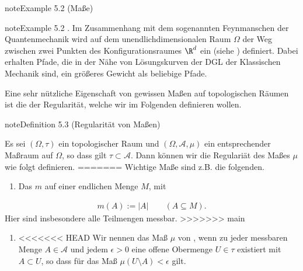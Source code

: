 \documentclass[letterpaper,10pt,english]{jupyterBook}
\begin{document}
\begin{sphinxadmonition}{note}{Example 5.2 (Maße)}
\begin{sphinxadmonition}{note}{Example 5.2}
. Im Zusammenhang mit dem sogenannten Feynmanschen  der Quantenmechanik wird auf dem unendlich\sphinxhyphen{}dimensionalen Raum \(\Omega\) der Weg zwischen zwei Punkten des Konfigurationsraumes \(\R^d\) ein  (siehe {\hyperref[\detokenize{masstheorie/masstheorie:rem:wahrscheinlichkeitsmass}]{}}) definiert.
Dabei erhalten Pfade, die in der Nähe von Lösungskurven der DGL der Klassischen Mechanik sind, ein größeres Gewicht als beliebige Pfade.
\end{sphinxadmonition}

\sphinxAtStartPar
Eine sehr nützliche Eigenschaft von gewissen Maßen auf topologischen Räumen ist die der Regularität, welche wir im Folgenden definieren wollen.
\label{masstheorie/masstheorie:def:regularitaet}
\begin{sphinxadmonition}{note}{Definition 5.3 (Regularität von Maßen)}



\sphinxAtStartPar
Es sei \((\Omega, \tau)\) ein topologischer Raum und \((\Omega, \mathcal{A}, \mu)\) ein entsprechender Maßraum auf \(\Omega\), so dass gilt \(\tau \subset \mathcal{A}\).
Dann können wir die Regulariät des Maßes \(\mu\) wie folgt definieren.
=======
Wichtige Maße sind z.B. die folgenden.
\begin{enumerate}
%
\item {} 
\sphinxAtStartPar
Das  \(m\) auf einer endlichen Menge \(M\), mit

\end{enumerate}
\begin{equation*}
\begin{split}m(A):=|A|\qquad (A\subseteq M).\end{split}
\end{equation*}
\sphinxAtStartPar
Hier sind insbesondere alle Teilmengen messbar.
>>>>>>> main
\begin{enumerate}
%
\item {} 
\sphinxAtStartPar
<<<<<<< HEAD
Wir nennen das Maß \(\mu\) von , wenn zu jeder messbaren Menge \(A \in \mathcal{A}\) und jedem \(\epsilon > 0\) eine offene Obermenge \(U \in \tau\) existiert mit \(A \subset U\), so dass für das Maß \(\mu(U\setminus A) < \epsilon\) gilt.


\end{enumerate}
\end{sphinxadmonition}
\end{sphinxadmonition}
\end{document}
